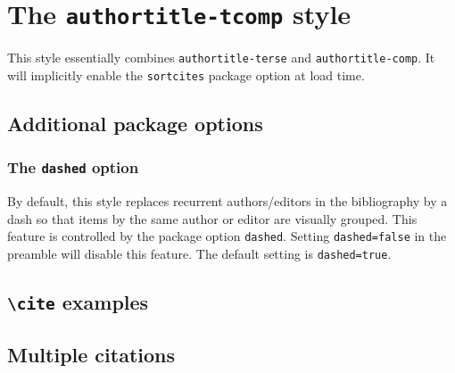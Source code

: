 \documentclass[a4paper]{article}
\newcommand{\cmd}[1]{\texttt{\textbackslash #1}}
\begin{document}
\section*{The \texttt{authortitle-tcomp} style}

This style essentially combines \texttt{authortitle-terse} and
\texttt{authortitle-comp}. It will implicitly enable the
\texttt{sortcites} package option at load time.

\subsection*{Additional package options}

\subsubsection*{The \texttt{dashed} option}

By default, this style replaces recurrent authors/editors in the
bibliography by a dash so that items by the same author or editor
are visually grouped. This feature is controlled by the package
option \texttt{dashed}. Setting \texttt{dashed=false} in the
preamble will disable this feature. The default setting is
\texttt{dashed=true}.

\subsection*{\cmd{cite} examples}

\cite{averroes/bland}

\cite{aristotle:physics}

\cite{aristotle:rhetoric}

\subsection*{Multiple citations}

\cite{aristotle:rhetoric,averroes/bland,aristotle:physics,aristotle:poetics}

\clearpage
\printbibliography
\end{document}
